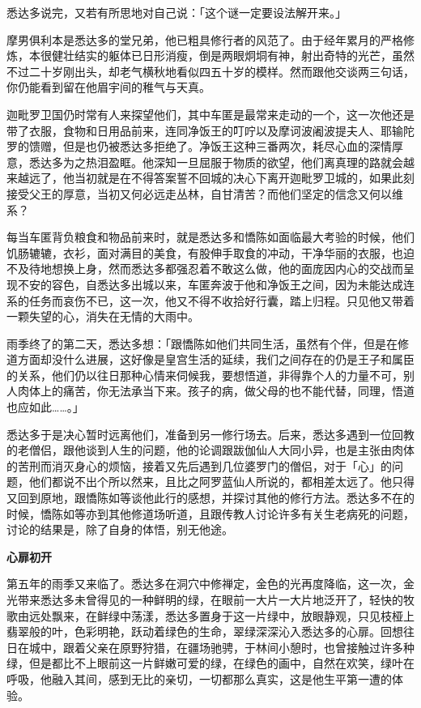\documentclass[twoside,openany]{book}
\newcommand{\mt}[1]{\textbullet \textbf{#1}}
\begin{document}
悉达多说完，又若有所思地对自己说：「这个谜一定要设法解开来。」

摩男俱利本是悉达多的堂兄弟，他已粗具修行者的风范了。由于经年累月的严格修炼，本很健壮结实的躯体已日形消瘦，倒是两眼炯垌有神，射出奇特的光芒，虽然不过二十岁刚出头，却老气横秋地看似四五十岁的模样。然而跟他交谈两三句话，你仍能看到留在他眉宇间的稚气与天真。

迦毗罗卫国仍时常有人来探望他们，其中车匿是最常来走动的一个，这一次他还是带了衣服，食物和日用品前来，连同净饭王的叮咛以及摩诃波阇波提夫人、耶输陀罗的馈赠，但是也仍被悉达多拒绝了。净饭王这种三番两次，耗尽心血的深情厚意，悉达多为之热泪盈眶。他深知一旦屈服于物质的欲望，他们离真理的路就会越来越远了，他当初就是在不得答案誓不回城的决心下离开迦毗罗卫城的，如果此刻接受父王的厚意，当初又何必远走丛林，自甘清苦？而他们坚定的信念又何以维系？

每当车匿背负粮食和物品前来时，就是悉达多和憍陈如面临最大考验的时候，他们饥肠辘辘，衣衫，面对满目的美食，有股伸手取食的冲动，干净华丽的衣服，也迫不及待地想换上身，然而悉达多都强忍着不敢这么做，他的面庞因内心的交战而呈现不安的容色，自悉达多出城以来，车匿奔波于他和净饭王之间，因为未能达成连系的任务而哀伤不已，这一次，他又不得不收拾好行囊，踏上归程。只见他又带着一颗失望的心，消失在无情的大雨中。

雨季终了的第二天，悉达多想：「跟憍陈如他们共同生活，虽然有个伴，但是在修道方面却没什么进展，这好像是皇宫生活的延续，我们之间存在的仍是王子和属臣的关系，他们仍以往日那种心情来伺候我，要想悟道，非得靠个人的力量不可，别人肉体上的痛苦，你无法承当下来。孩子的病，做父母的也不能代替，同理，悟道也应如此……。」

悉达多于是决心暂时远离他们，准备到另一修行场去。后来，悉达多遇到一位回教的老僧侣，跟他谈到人生的问题，他的论调跟跋伽仙人大同小异，也是主张由肉体的苦刑而消灭身心的烦恼，接着又先后遇到几位婆罗门的僧侣，对于「心」的问题，他们都说不出个所以然来，且比之阿罗蓝仙人所说的，都相差太远了。他只得又回到原地，跟憍陈如等谈他此行的感想，并探讨其他的修行方法。悉达多不在的时候，憍陈如等亦到其他修道场听道，且跟传教人讨论许多有关生老病死的问题，讨论的结果是，除了自身的体悟，别无他途。

\mt{心扉初开}

第五年的雨季又来临了。悉达多在洞穴中修禅定，金色的光再度降临，这一次，金光带来悉达多未曾得见的一种鲜明的绿，在眼前一大片一大片地泛开了，轻快的牧歌由远处飘来，在鲜绿中荡漾，悉达多置身于这一片绿中，放眼静观，只见枝桠上翡翠般的叶，色彩明艳，跃动着绿色的生命，翠绿深深沁入悉达多的心扉。回想往日在城中，跟着父亲在原野狩猎，在疆场驰骋，于林间小憩时，也曾接触过许多种绿，但是都比不上眼前这一片鲜嫩可爱的绿，在绿色的画中，自然在欢笑，绿叶在呼吸，他融入其间，感到无比的亲切，一切都那么真实，这是他生平第一遭的体验。
\end{document}
